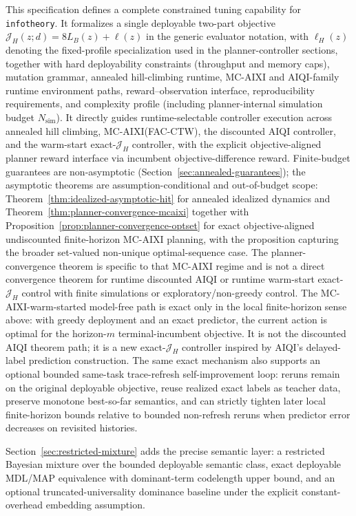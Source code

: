 \documentclass[11pt]{article}
\begin{document}
This specification defines a complete constrained tuning capability for
\texttt{infotheory}. It formalizes a single deployable two-part objective
$\mathcal{J}_H(z;d)=8L_B(z)+\ell(z)$ in the generic evaluator notation, with
$\ell_H(z)$ denoting the fixed-profile specialization used in the
planner-controller sections, together with hard deployability constraints
(throughput and memory caps),
mutation grammar, annealed hill-climbing runtime,
MC-AIXI and AIQI-family runtime environment paths,
reward--observation interface, reproducibility requirements, and complexity
profile (including planner-internal simulation budget $N_{\mathrm{sim}}$). It directly guides runtime-selectable controller
execution across annealed hill climbing, MC-AIXI(FAC-CTW),
the discounted AIQI controller, and the warm-start exact-$\mathcal{J}_H$
controller, with the explicit objective-aligned planner reward interface via
incumbent objective-difference reward. Finite-budget
guarantees are non-asymptotic (Section~\ref{sec:annealed-guarantees}); the
asymptotic theorems are assumption-conditional and out-of-budget scope:
Theorem~\ref{thm:idealized-asymptotic-hit} for annealed idealized dynamics and
Theorem~\ref{thm:planner-convergence-mcaixi} together with
Proposition~\ref{prop:planner-convergence-optset} for exact objective-aligned
undiscounted finite-horizon MC-AIXI planning, with the proposition capturing
the broader set-valued non-unique optimal-sequence case. The planner-convergence theorem
is specific to that MC-AIXI regime and is not a direct convergence theorem for
runtime discounted AIQI or runtime warm-start exact-$\mathcal{J}_H$ control
with finite simulations or exploratory/non-greedy control.
The MC-AIXI-warm-started model-free path is exact only in the local
finite-horizon sense above: with greedy deployment and an exact predictor, the
current action is optimal for the horizon-$m$ terminal-incumbent objective.
It is not the discounted AIQI theorem path; it is a new exact-$\mathcal{J}_H$
controller inspired by AIQI's delayed-label prediction construction.
The same exact mechanism also supports an optional bounded same-task
trace-refresh self-improvement loop: reruns remain on the original deployable
objective, reuse realized exact labels as teacher data, preserve monotone
best-so-far semantics, and can strictly tighten later local finite-horizon
bounds relative to bounded non-refresh reruns when predictor error decreases on
revisited histories.

Section~\ref{sec:restricted-mixture} adds the precise semantic layer: a
restricted Bayesian mixture over the bounded deployable semantic class, exact
deployable MDL/MAP equivalence with dominant-term codelength upper bound, and
an optional truncated-universality dominance baseline under the explicit
constant-overhead embedding assumption.
\end{document}
